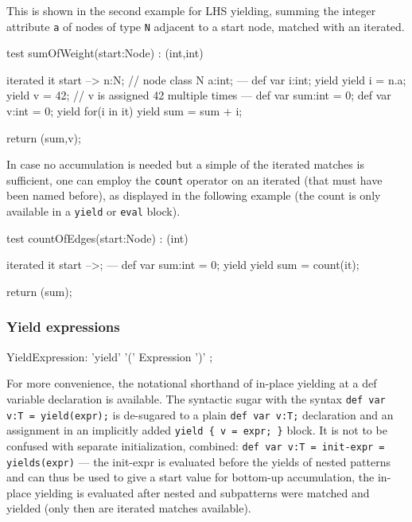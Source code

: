 This is shown in the second example for LHS yielding, summing the integer attribute \texttt{a} of nodes of type \texttt{N} adjacent to a start node, matched with an iterated.

\begin{example}
  \begin{grgen}
test sumOfWeight(start:Node) : (int,int)
{	
  iterated it {
    start --> n:N; // node class N { a:int; }
	---
    def var i:int;
    yield {
      yield i = n.a;
      yield v = 42; // v is assigned 42 multiple times
    }
  } 
---
  def var sum:int = 0;
  def var v:int = 0;
  yield {
    for(i in it)
    {
      yield sum = sum + i;
    }
  }

  return (sum,v);
}
  \end{grgen}
\end{example}

In case no accumulation is needed but a simple  of the iterated matches is sufficient, one can employ the \texttt{count} operator on an iterated (that must have been named before), as displayed in the following example (the count is only available in a \texttt{yield} or \texttt{eval} block).

\begin{example}
  \begin{grgen}
test countOfEdges(start:Node) : (int)
{
	iterated it {
    start -->;
  } 
---
  def var sum:int = 0;
  yield {
    yield sum = count(it);
  }

  return (sum);
}
  \end{grgen}
\end{example}

\subsubsection*{Yield expressions} 

\begin{rail} 
  YieldExpression: 'yield' '(' Expression ')' ;
\end{rail}

For more convenience, the notational shorthand of in-place yielding at a def variable declaration is available. The syntactic sugar with the syntax \texttt{def var v:T = yield(expr);} is de-sugared to a plain \texttt{def var v:T;} declaration and an assignment in an implicitly added \verb#yield { v = expr; }# block.
It is not to be confused with separate initialization, combined: \texttt{def var v:T = init-expr = yields(expr)} --- the init-expr is evaluated before the yields of nested patterns and can thus be used to give a start value for bottom-up accumulation, the in-place yielding is evaluated after nested and subpatterns were matched and yielded (only then are iterated matches available).
	
